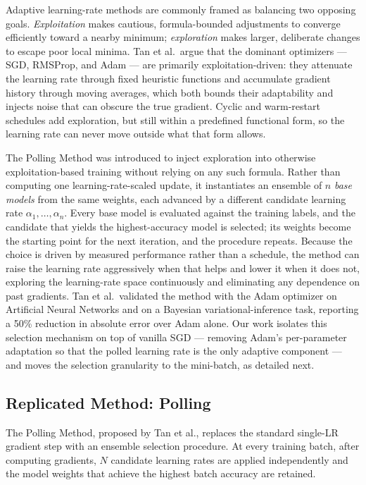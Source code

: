 \documentclass[conference]{IEEEtran}
\begin{document}
Adaptive learning-rate methods are commonly framed as balancing two opposing goals. \emph{Exploitation} makes cautious, formula-bounded adjustments to converge efficiently toward a nearby minimum; \emph{exploration} makes larger, deliberate changes to escape poor local minima. Tan et al.\ argue that the dominant optimizers --- SGD, RMSProp, and Adam --- are primarily exploitation-driven: they attenuate the learning rate through fixed heuristic functions and accumulate gradient history through moving averages, which both bounds their adaptability and injects noise that can obscure the true gradient. Cyclic and warm-restart schedules add exploration, but still within a predefined functional form, so the learning rate can never move outside what that form allows.

The Polling Method was introduced to inject exploration into otherwise exploitation-based training without relying on any such formula. Rather than computing one learning-rate-scaled update, it instantiates an ensemble of $n$ \emph{base models} from the same weights, each advanced by a different candidate learning rate $\alpha_1, \ldots, \alpha_n$. Every base model is evaluated against the training labels, and the candidate that yields the highest-accuracy model is selected; its weights become the starting point for the next iteration, and the procedure repeats. Because the choice is driven by measured performance rather than a schedule, the method can raise the learning rate aggressively when that helps and lower it when it does not, exploring the learning-rate space continuously and eliminating any dependence on past gradients. Tan et al.\ validated the method with the Adam optimizer on Artificial Neural Networks and on a Bayesian variational-inference task, reporting a 50\% reduction in absolute error over Adam alone. Our work isolates this selection mechanism on top of vanilla SGD --- removing Adam's per-parameter adaptation so that the polled learning rate is the only adaptive component --- and moves the selection granularity to the mini-batch, as detailed next.

\subsection{Replicated Method: Polling}

The Polling Method, proposed by Tan et al., replaces the standard single-LR gradient step with an ensemble selection procedure. At every training batch, after computing gradients, $N$ candidate learning rates are applied independently and the model weights that achieve the highest batch accuracy are retained.
\end{document}
